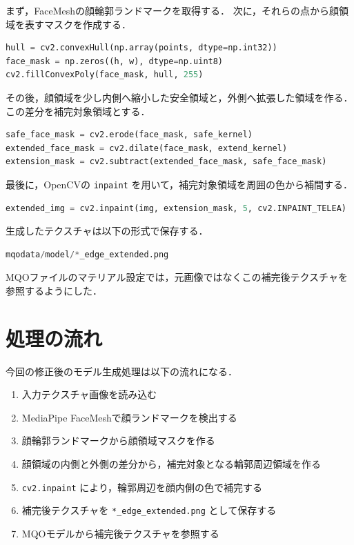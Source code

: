 \documentclass[uplatex,dvipdfmx]{jsarticle}
\begin{document}
まず，FaceMeshの顔輪郭ランドマークを取得する．
次に，それらの点から顔領域を表すマスクを作成する．

\begin{lstlisting}[language=Python]
hull = cv2.convexHull(np.array(points, dtype=np.int32))
face_mask = np.zeros((h, w), dtype=np.uint8)
cv2.fillConvexPoly(face_mask, hull, 255)
\end{lstlisting}

その後，顔領域を少し内側へ縮小した安全領域と，外側へ拡張した領域を作る．
この差分を補完対象領域とする．

\begin{lstlisting}[language=Python]
safe_face_mask = cv2.erode(face_mask, safe_kernel)
extended_face_mask = cv2.dilate(face_mask, extend_kernel)
extension_mask = cv2.subtract(extended_face_mask, safe_face_mask)
\end{lstlisting}

最後に，OpenCVの \verb|inpaint| を用いて，補完対象領域を周囲の色から補間する．

\begin{lstlisting}[language=Python]
extended_img = cv2.inpaint(img, extension_mask, 5, cv2.INPAINT_TELEA)
\end{lstlisting}

生成したテクスチャは以下の形式で保存する．

\begin{lstlisting}[language=Python]
mqodata/model/*_edge_extended.png
\end{lstlisting}

MQOファイルのマテリアル設定では，元画像ではなくこの補完後テクスチャを参照するようにした．

\section{処理の流れ}

今回の修正後のモデル生成処理は以下の流れになる．

\begin{enumerate}
  \item 入力テクスチャ画像を読み込む
  \item MediaPipe FaceMeshで顔ランドマークを検出する
  \item 顔輪郭ランドマークから顔領域マスクを作る
  \item 顔領域の内側と外側の差分から，補完対象となる輪郭周辺領域を作る
  \item \verb|cv2.inpaint| により，輪郭周辺を顔内側の色で補完する
  \item 補完後テクスチャを \verb|*_edge_extended.png| として保存する
  \item MQOモデルから補完後テクスチャを参照する
\end{enumerate}
\end{document}
